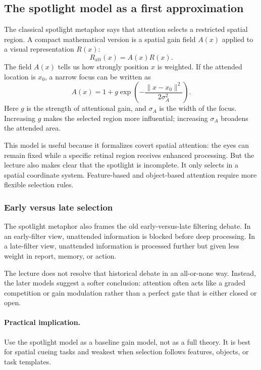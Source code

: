 \subsection{The spotlight model as a first approximation}

The classical spotlight metaphor says that attention selects a restricted spatial region. A compact mathematical version is a spatial gain field \(A(x)\) applied to a visual representation \(R(x)\):
\[
R_{\mathrm{att}}(x) = A(x)R(x).
\]
The field \(A(x)\) tells us how strongly position \(x\) is weighted. If the attended location is \(x_0\), a narrow focus can be written as
\[
A(x)
=
1 + g\exp\left(-\frac{\|x-x_0\|^2}{2\sigma_A^2}\right).
\]
Here \(g\) is the strength of attentional gain, and \(\sigma_A\) is the width of the focus. Increasing \(g\) makes the selected region more influential; increasing \(\sigma_A\) broadens the attended area.

This model is useful because it formalizes covert spatial attention: the eyes can remain fixed while a specific retinal region receives enhanced processing. But the lecture also makes clear that the spotlight is incomplete. It only selects in a spatial coordinate system. Feature-based and object-based attention require more flexible selection rules.

\subsubsection{Early versus late selection}

The spotlight metaphor also frames the old early-versus-late filtering debate. In an early-filter view, unattended information is blocked before deep processing. In a late-filter view, unattended information is processed further but given less weight in report, memory, or action.

The lecture does not resolve that historical debate in an all-or-none way. Instead, the later models suggest a softer conclusion: attention often acts like a graded competition or gain modulation rather than a perfect gate that is either closed or open.

\paragraph{Practical implication.}
Use the spotlight model as a baseline gain model, not as a full theory. It is best for spatial cueing tasks and weakest when selection follows features, objects, or task templates.

